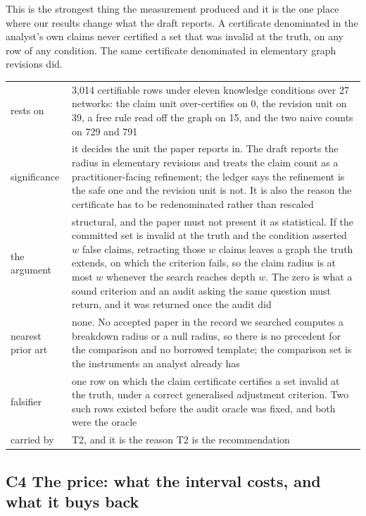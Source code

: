 This is the strongest thing the measurement produced and it is the one place where our results
change what the draft reports. A certificate denominated in the analyst's own claims never
certified a set that was invalid at the truth, on any row of any condition. The same certificate
denominated in elementary graph revisions did.

\begin{center}\footnotesize
\begin{tabular}{@{}p{2.6cm}p{13.75cm}@{}}
\toprule
rests on & 3{,}014 certifiable rows under eleven knowledge conditions over 27 networks: the claim
unit over-certifies on 0, the revision unit on 39, a free rule read off the graph on 15, and the
two naive counts on 729 and 791 \\
significance & it decides the unit the paper reports in. The draft reports the radius in elementary
revisions and treats the claim count as a practitioner-facing refinement; the ledger says the
refinement is the safe one and the revision unit is not. It is also the reason the certificate has
to be redenominated rather than rescaled \\
the argument & structural, and the paper must not present it as statistical. If the committed set
is invalid at the truth and the condition asserted $w$ false claims, retracting those $w$ claims
leaves a graph the truth extends, on which the criterion fails, so the claim radius is at most $w$
whenever the search reaches depth $w$. The zero is what a sound criterion and an audit asking the
same question must return, and it was returned once the audit did \\
nearest prior art & none. No accepted paper in the record we searched computes a breakdown radius
or a null radius, so there is no precedent for the comparison and no borrowed template; the
comparison set is the instruments an analyst already has \\
falsifier & one row on which the claim certificate certifies a set invalid at the truth, under a
correct generalised adjustment criterion. Two such rows existed before the audit oracle was fixed,
and both were the oracle \\
carried by & T2, and it is the reason T2 is the recommendation \\
\bottomrule
\end{tabular}
\end{center}

\subsection*{C4 \quad The price: what the interval costs, and what it buys back}

